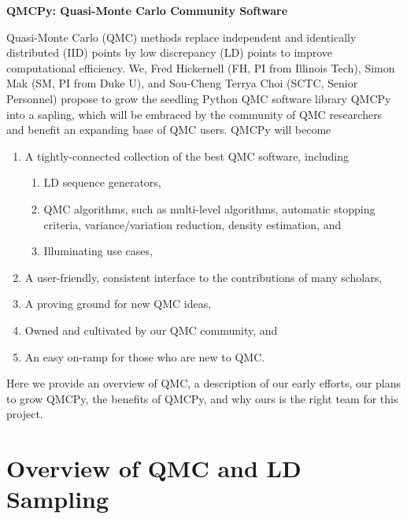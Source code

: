 \documentclass[11pt]{NSFamsart}
\begin{document}

\begin{center}
\Large \textbf{
QMCPy: Quasi-Monte Carlo Community Software\\ 
}
\end{center}
\vspace{-2ex}

\setcounter{tocdepth}{1}
\tableofcontents

\vspace{-6ex}


Quasi-Monte Carlo (QMC) methods replace independent and identically distributed (IID) points by low discrepancy (LD) points to improve computational efficiency.  We, Fred Hickernell (FH, PI from Illinois Tech), Simon Mak (SM, PI from Duke U), and Sou-Cheng Terrya Choi (SCTC, Senior Personnel) propose to grow the seedling Python QMC software library QMCPy \cite{QMCPy2020a} into a sapling, which will be embraced by the community of QMC researchers and benefit an expanding base of QMC users.  QMCPy will become
\begin{enumerate}
\renewcommand{\labelenumi}{\arabic{enumi}.}
    \item A tightly-connected collection of the best QMC software, including
    \begin{enumerate}
    \renewcommand{\labelenumii}{\alph{enumii}.}
        \item LD sequence generators,
        \item QMC algorithms, such as multi-level algorithms, automatic stopping criteria, variance/variation reduction, density estimation, and
        \item Illuminating use cases,
    \end{enumerate}
    \item A user-friendly, consistent interface to the contributions of many scholars,
    \item A proving ground for new QMC ideas,
    \item Owned and cultivated by our QMC community, and
    \item An easy on-ramp for those who are new to QMC.
\end{enumerate}

Here we provide an overview of QMC, a description of our early efforts, our plans to grow QMCPy, the benefits of QMCPy, and why ours is the right team for this project.

\section{Overview of QMC and LD Sampling}
\end{document}
